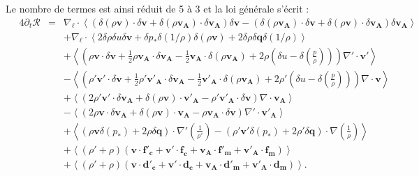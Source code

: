 Le nombre de termes est ainsi réduit de 5 à 3 et la loi  générale s'écrit : 
\begin{equation}
\boxed{
\begin{array}{lcl}
\label{eq:turb_cpi_khm3}\quad 4\partial_t \mathcal{R} &=& \nabla_{\boldsymbol{\ell}} \cdot \left<\left(\delta \left(\rho\boldsymbol{v}\right) \cdot \delta \boldsymbol{v}+ \delta \left(\rho\boldsymbol{v_A}\right) \cdot \delta \boldsymbol{v_A}\right) \delta \boldsymbol{v}  -\left(\delta \left(\rho\boldsymbol{v_A}\right) \cdot \delta \boldsymbol{v}  + \delta \left(\rho\boldsymbol{v}\right) \cdot \delta \boldsymbol{v_A}  \right) \delta \boldsymbol{v_A} \right>\\
&& + \nabla_{\boldsymbol{\ell}} \cdot \left<2 \delta \rho \delta u \delta \boldsymbol{v}+ \delta p_*  \delta \left(1/\rho\right) \delta\left(\rho \boldsymbol{v}\right) + 2\delta \rho \delta \boldsymbol{q}\delta \left(1/\rho\right) \right> \\
&& +\left< \left(\rho \boldsymbol{v} \cdot \delta \boldsymbol{v} +\frac{1}{2} \rho \boldsymbol{v_A} \cdot \delta \boldsymbol{v_A} -\frac{1}{2} \boldsymbol{v_A} \cdot \delta \left(\rho \boldsymbol{v_A}\right) + 2\rho \left(\delta u - \delta \left(\frac{p}{\rho}\right)\right) \right) \nabla' \cdot \boldsymbol{v'} \right>\\
&& -\left<\left( \rho' \boldsymbol{v'} \cdot \delta \boldsymbol{v} +\frac{1}{2} \rho' \boldsymbol{v'_A} \cdot \delta \boldsymbol{v_A} -\frac{1}{2} \boldsymbol{v'_A} \cdot \delta \left(\rho \boldsymbol{v_A}\right) + 2\rho' \left(\delta u - \delta \left(\frac{p}{\rho}\right)\right)  \right)\nabla \cdot \boldsymbol{v}\right>\\
&&+ \left<\left(2 \rho' \boldsymbol{v'} \cdot \delta \boldsymbol{v_A}+ \delta\left(\rho \boldsymbol{v}\right) \cdot \boldsymbol{v'_A} - \rho' \boldsymbol{v'_A} \cdot \delta \boldsymbol{v}  \right)\nabla \cdot \boldsymbol{v_A}\right>\\
&&- \left<\left(2\rho \boldsymbol{v} \cdot \delta \boldsymbol{v_A} + \delta\left(\rho \boldsymbol{v}\right) \cdot \boldsymbol{v_A} - \rho \boldsymbol{v_A} \cdot \delta \boldsymbol{v}  \right)\nabla' \cdot \boldsymbol{v'_A}\right> \\
&&+ \left< \left(\rho\boldsymbol{v} \delta \left(p_*\right)  + 2 \rho \delta \boldsymbol{q}\right) \cdot \nabla'\left(\frac{1}{\rho'}\right) - \left(\rho' \boldsymbol{v'}\delta \left(p_*\right) + 2\rho' \delta \boldsymbol{q} \right) \cdot \nabla \left(\frac{1}{\rho}\right)\right>\\
&&+  \left<\left(\rho' + \rho\right)\left(\boldsymbol{v} \cdot \boldsymbol{f'_c} + \boldsymbol{v'} \cdot \boldsymbol{f_c} + \boldsymbol{v_A} \cdot \boldsymbol{f'_m} + \boldsymbol{v'_A} \cdot \boldsymbol{f_m}\right) \right>\\
&&+ \left<\left(\rho' + \rho\right)\left(\boldsymbol{v} \cdot \boldsymbol{d'_c} + \boldsymbol{v'} \cdot \boldsymbol{d_c}+\boldsymbol{v_A} \cdot \boldsymbol{d'_m} + \boldsymbol{v'_A} \cdot \boldsymbol{d_m}\right)\right> .
\end{array}}
\end{equation}
